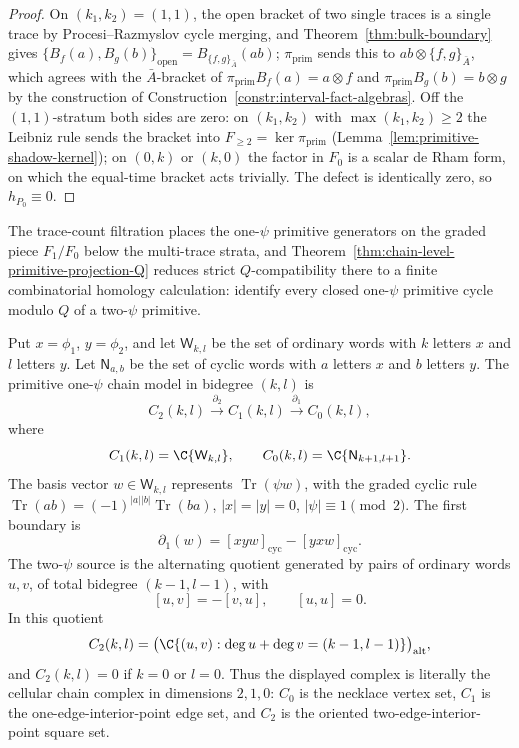 \begin{proof}
  On $(k_1,k_2)=(1,1)$, the open bracket of two single traces is a
  single trace by Procesi--Razmyslov cycle merging, and
  Theorem~\ref{thm:bulk-boundary} gives
  $\{B_f(a),B_g(b)\}_{\mathrm{open}}=B_{\{f,g\}_{\bar A}}(ab)$;
  $\pi_{\mathrm{prim}}$ sends this to $ab\otimes\{f,g\}_{\bar A}$,
  which agrees with the $\bar A$-bracket of
  $\pi_{\mathrm{prim}}B_f(a)=a\otimes f$ and
  $\pi_{\mathrm{prim}}B_g(b)=b\otimes g$ by the construction of
  Construction~\ref{constr:interval-fact-algebras}.  Off the
  $(1,1)$-stratum both sides are zero: on $(k_1,k_2)$ with
  $\max(k_1,k_2)\geq 2$ the Leibniz rule sends the bracket into
  $F_{\geq 2}=\ker\pi_{\mathrm{prim}}$
  (Lemma~\ref{lem:primitive-shadow-kernel}); on $(0,k)$ or $(k,0)$ the
  factor in $F_0$ is a scalar de Rham form, on which the equal-time
  bracket acts trivially.  The defect is identically zero, so
  $h_{P_0}\equiv 0$.
\end{proof}


\begin{constr}\label{constr:T5-one-psi-complex}
  The trace-count filtration places the one-\(\psi\) primitive
  generators on the graded piece \(F_1/F_0\) below the multi-trace strata, and
  Theorem~\ref{thm:chain-level-primitive-projection-Q} reduces strict
  \(Q\)-compatibility there to a finite combinatorial homology
  calculation: identify every closed one-\(\psi\) primitive cycle
  modulo \(Q\) of a two-\(\psi\) primitive.

  Put \(x=\phi_1\), \(y=\phi_2\), and let
  \(\mathsf W_{k,l}\) be the set of ordinary words with \(k\) letters
  \(x\) and \(l\) letters \(y\).  Let \(\mathsf N_{a,b}\) be the set of
  cyclic words with \(a\) letters \(x\) and \(b\) letters \(y\).  The
  primitive one-\(\psi\) chain model in bidegree \((k,l)\) is
  \[
    C_2(k,l)\xrightarrow{\partial_2}C_1(k,l)
      \xrightarrow{\partial_1}C_0(k,l),
  \]
  where
  \[
    C_1(k,l)=\C\{\mathsf W_{k,l}\},\qquad
    C_0(k,l)=\C\{\mathsf N_{k+1,l+1}\}.
  \]
	  The basis vector \(w\in\mathsf W_{k,l}\) represents
	  \(\operatorname{Tr}(\psi w)\), with the graded cyclic rule
	  \(\operatorname{Tr}(ab)=(-1)^{|a||b|}\operatorname{Tr}(ba)\),
	  \(|x|=|y|=0\), \(|\psi|\equiv1\pmod2\).  The first boundary is
  \[
    \partial_1(w)=[xyw]_{\mathrm{cyc}}-[yxw]_{\mathrm{cyc}}.
  \]
  The two-\(\psi\) source is the alternating quotient generated by pairs
  of ordinary words \(u,v\), of total bidegree \((k-1,l-1)\), with
  \[
    [u,v]=-[v,u],\qquad [u,u]=0.
  \]
  In this quotient
  \[
    C_2(k,l)=
    \bigl(\C\{(u,v):\deg u+\deg v=(k-1,l-1)\}\bigr)_{\mathrm{alt}},
  \]
  and \(C_2(k,l)=0\) if \(k=0\) or \(l=0\).
  Thus the displayed complex is literally the cellular chain complex in
  dimensions \(2,1,0\): \(C_0\) is the necklace vertex set,
  \(C_1\) is the one-edge-interior-point edge set, and \(C_2\) is the
  oriented two-edge-interior-point square set.
\end{constr}


